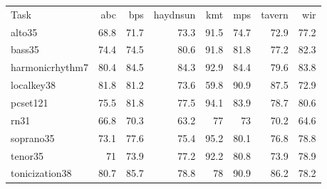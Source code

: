 \begin{tabular}{lrrrrrrr}
Task             & \acrshort{abc}  & \acrshort{bps}  & \acrshort{haydnsun} & \acrshort{kmt} & \acrshort{mps}  & \acrshort{tavern} & \acrshort{wir}  \\
\gls{alto35}           & 68.8 & 71.7 & 73.3     & 91.5    & 74.7 & 72.9   & 77.2 \\
\gls{bass35}           & 74.4 & 74.5 & 80.6     & 91.8    & 81.8 & 77.2   & 82.3 \\
\gls{harmonicrhythm7}  & 80.4 & 84.5 & 84.3     & 92.9    & 84.4 & 79.6   & 83.8 \\
\gls{localkey38}       & 81.8 & 81.2 & 73.6     & 59.8    & 90.9 & 87.5   & 72.9 \\
\gls{pcset121} & 75.5 & 81.8 & 77.5     & 94.1    & 83.9 & 78.7   & 80.6 \\
\gls{rn31}   & 66.8 & 70.3 & 63.2     & 77      & 73   & 70.2   & 64.6 \\
\gls{soprano35}        & 73.1 & 77.6 & 75.4     & 95.2    & 80.1 & 76.8   & 78.8 \\
\gls{tenor35}          & 71   & 73.9 & 77.2     & 92.2    & 80.8 & 73.9   & 78.9 \\
\gls{tonicization38}   & 80.7 & 85.7 & 78.8     & 78      & 90.9 & 86.2   & 78.2
\end{tabular}
